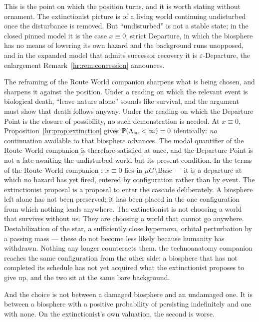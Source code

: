 \begin{remark}
\label{hr:rem:undisturbed}
This is the point on which the position turns, and it is worth stating
without ornament. The extinctionist picture is of a living world
continuing undisturbed once the disturbance is removed. But
``undisturbed'' is not a stable state; in the closed pinned model it is
the case $x\equiv0$, strict Departure, in which the biosphere has no
means of lowering its own hazard and the background runs unopposed, and
in the expanded model that admits successor recovery it is
$\varepsilon$-Departure, the enlargement Remark~\ref{hr:rem:concession}
announces.

The reframing of the Route World companion \cite{GoldenRouteWorld} sharpens what is
being chosen, and sharpens it against the position. Under a reading on
which the relevant event is biological death, ``leave nature alone''
sounds like survival, and the argument must show that death follows
anyway. Under the reading on which the Departure Point is the closure of
possibility, no such demonstration is needed. At $x\equiv0$,
Proposition~\ref{hr:prop:extinction} gives
$\mathbb{P}(\Lambda_\infty<\infty)=0$ identically: \emph{no} continuation
available to that biosphere advances. The modal quantifier of
the Route World companion \cite{GoldenRouteWorld} is therefore satisfied at once, and
the Departure Point is not a fate awaiting the undisturbed world but
its present condition. In the terms of
the Route World companion \cite{GoldenRouteWorld}: $x\equiv0$ lies in
$\mu G\setminus\mathrm{Base}$ --- it is a departure at which no hazard
has yet fired, entered by configuration rather than by event. The
extinctionist proposal is a proposal to enter the cascade
deliberately. A biosphere left alone has not been preserved;
it has been placed in the one configuration from which nothing
leads anywhere. The extinctionist is not choosing a world that
survives without us. They are choosing a world that cannot go
anywhere. Destabilization of the star, a sufficiently
close hypernova, orbital perturbation by a passing mass --- these do not
become less likely because humanity has withdrawn. Nothing any longer
counteracts them. the technoanatomy companion \cite{GoldenTechnoanatomy} reaches the same
configuration from the other side: a biosphere that has not completed its
schedule has not yet acquired what the extinctionist proposes to give up,
and the two sit at the same bare background.

And the choice is not between a damaged biosphere and an undamaged one.
It is between a biosphere with a positive probability of persisting
indefinitely and one with none. On the extinctionist's own valuation,
the second is worse.
\end{remark}

